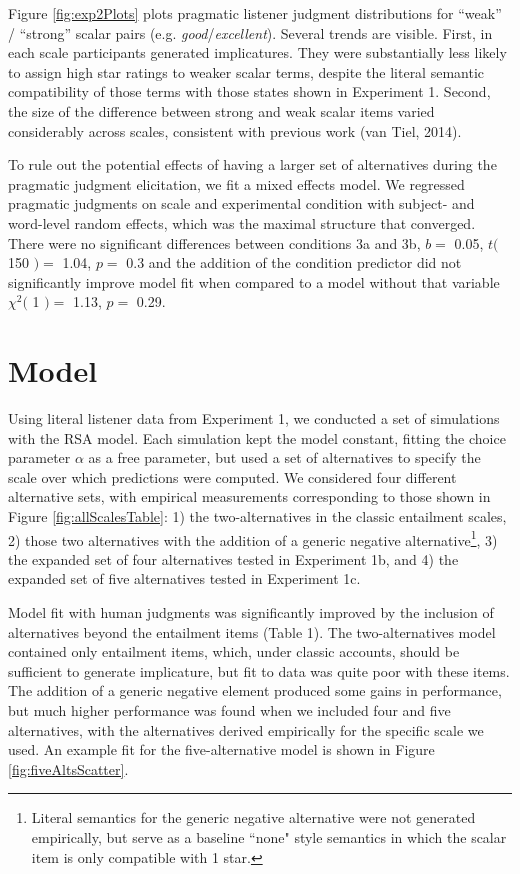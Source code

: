 \documentclass[10pt, letterpaper]{article}
\begin{document}
Figure \ref{fig:exp2Plots} plots pragmatic listener judgment
distributions for ``weak'' / ``strong'' scalar pairs (e.g.
\emph{good}/\emph{excellent}). Several trends are visible. First, in
each scale participants generated implicatures. They were substantially
less likely to assign high star ratings to weaker scalar terms, despite
the literal semantic compatibility of those terms with those states
shown in Experiment 1. Second, the size of the difference between strong
and weak scalar items varied considerably across scales, consistent with
previous work ({van Tiel}, 2014).

To rule out the potential effects of having a larger set of alternatives
during the pragmatic judgment elicitation, we fit a mixed effects model.
We regressed pragmatic judgments on scale and experimental condition
with subject- and word-level random effects, which was the maximal
structure that converged. There were no significant differences between
conditions 3a and 3b, \(b =\) 0.05, \(t(\) 150 \() =\) 1.04, \(p =\) 0.3
and the addition of the condition predictor did not significantly
improve model fit when compared to a model without that variable
\(\chi^2(\) 1 \() =\) 1.13, \(p =\) 0.29.

\section{Model}\label{model}

Using literal listener data from Experiment 1, we conducted a set of
simulations with the RSA model. Each simulation kept the model constant,
fitting the choice parameter \(\alpha\) as a free parameter, but used a
set of alternatives to specify the scale over which predictions were
computed. We considered four different alternative sets, with empirical
measurements corresponding to those shown in Figure
\ref{fig:allScalesTable}: 1) the two-alternatives in the classic
entailment scales, 2) those two alternatives with the addition of a
generic negative
alternative\footnote{Literal semantics for the generic negative alternative were not generated empirically, but serve as a baseline ``none" style semantics in which the scalar item is only compatible with 1 star.},
3) the expanded set of four alternatives tested in Experiment 1b, and 4)
the expanded set of five alternatives tested in Experiment 1c.

Model fit with human judgments was significantly improved by the
inclusion of alternatives beyond the entailment items (Table 1). The
two-alternatives model contained only entailment items, which, under
classic accounts, should be sufficient to generate implicature, but fit
to data was quite poor with these items. The addition of a generic
negative element produced some gains in performance, but much higher
performance was found when we included four and five alternatives, with
the alternatives derived empirically for the specific scale we used. An
example fit for the five-alternative model is shown in Figure
\ref{fig:fiveAltsScatter}.
\end{document}
